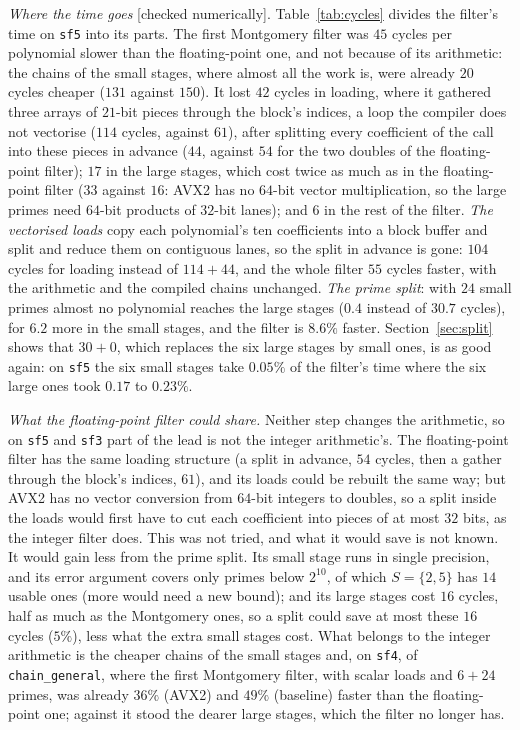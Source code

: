 \documentclass[10pt,a4paper]{article}
\newcommand{\code}[1]{\texttt{#1}}
\newcommand{\stnum}{\textsf{\small[checked numerically]}\xspace}
\theoremstyle{plain}
\theoremstyle{definition}
\begin{document}
\emph{Where the time goes} \stnum.  Table~\ref{tab:cycles} divides the filter's time on \code{sf5} into its parts.  The first Montgomery filter was $45$ cycles per
polynomial slower than the floating-point one, and not because of its arithmetic: the chains of the small stages, where almost all the work is, were already $20$
cycles cheaper ($131$ against $150$).  It lost $42$ cycles in loading, where it gathered three arrays of $21$-bit pieces through the block's indices, a loop the
compiler does not vectorise ($114$ cycles, against $61$), after splitting every coefficient of the call into these pieces in advance ($44$, against $54$ for the
two doubles of the floating-point filter); $17$ in the large stages, which cost twice as much as in the floating-point filter ($33$ against $16$: AVX2 has no
$64$-bit vector multiplication, so the large primes need $64$-bit products of $32$-bit lanes); and $6$ in the rest of the filter.  \emph{The vectorised loads} copy
each polynomial's ten coefficients into a block buffer and split and reduce them on contiguous lanes, so the split in advance is gone: $104$ cycles for loading
instead of $114+44$, and the whole filter $55$ cycles faster, with the arithmetic and the compiled chains unchanged.  \emph{The prime split}: with $24$ small
primes almost no polynomial reaches the large stages ($0.4$ instead of $30.7$ cycles), for $6.2$ more in the small stages, and the filter is $8.6\%$ faster.
Section~\ref{sec:split} shows that $30+0$, which replaces the six large stages by small ones, is as good again: on \code{sf5} the six small stages take $0.05\%$ of
the filter's time where the six large ones took $0.17$ to $0.23\%$.

\emph{What the floating-point filter could share.}  Neither step changes the arithmetic, so on \code{sf5} and \code{sf3} part of the lead is not the integer
arithmetic's.  The floating-point filter has the same loading structure (a split in advance, $54$ cycles, then a gather through the block's indices, $61$), and its
loads could be rebuilt the same way; but AVX2 has no vector conversion from $64$-bit integers to doubles, so a split inside the loads would first have to cut each
coefficient into pieces of at most $32$ bits, as the integer filter does.  This was not tried, and what it would save is not known.  It would gain less from the
prime split.  Its small stage runs in single precision, and its error argument covers only primes below $2^{10}$, of which $S=\{2,5\}$ has $14$ usable ones (more
would need a new bound); and its large stages cost $16$ cycles, half as much as the Montgomery ones, so a split could save at most these $16$ cycles ($5\%$), less
what the extra small stages cost.  What belongs to the integer arithmetic is the cheaper chains of the small stages and, on \code{sf4}, of \code{chain\_general},
where the first Montgomery filter, with scalar loads and $6+24$ primes, was already $36\%$ (AVX2) and $49\%$ (baseline) faster than the floating-point one; against
it stood the dearer large stages, which the filter no longer has.
\end{document}
